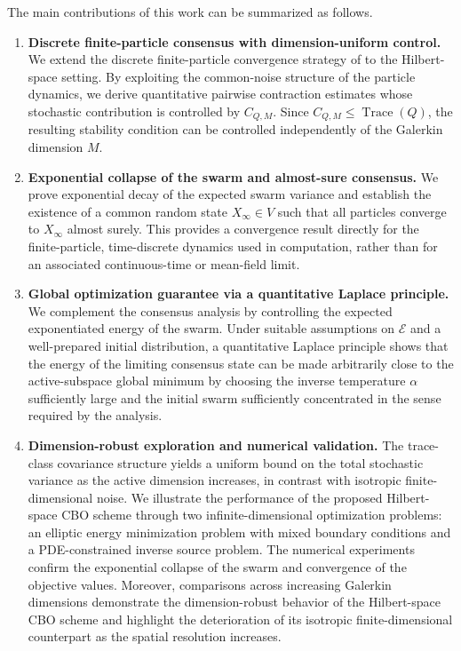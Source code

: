 \documentclass[12pt]{amsart}
\numberwithin{equation}{section}
\begin{document}
The main contributions of this work can be summarized as follows.
\begin{enumerate}
    \item \textbf{Discrete finite-particle consensus with dimension-uniform control.} We extend the discrete finite-particle convergence strategy of \cite{ha2020convergence,ha2021convergence} to the Hilbert-space setting. By exploiting the common-noise structure of the particle dynamics, we derive quantitative pairwise contraction estimates whose stochastic contribution is controlled by $C_{Q,M}$. Since $C_{Q,M}\leq\operatorname{Trace}(Q)$, the resulting stability condition can be controlled independently of the Galerkin dimension $M$.

    \item \textbf{Exponential collapse of the swarm and almost-sure consensus.} We prove exponential decay of the expected swarm variance and establish the existence of a common random state $X_\infty\in V$ such that all particles converge to $X_\infty$ almost surely. This provides a convergence result directly for the finite-particle, time-discrete dynamics used in computation, rather than for an associated continuous-time or mean-field limit.

    \item \textbf{Global optimization guarantee via a quantitative Laplace principle.} We complement the consensus analysis by controlling the expected exponentiated energy of the swarm. Under suitable assumptions on $\mathscr{E}$ and a well-prepared initial distribution, a quantitative Laplace principle shows that the energy of the limiting consensus state can be made arbitrarily close to the active-subspace global minimum by choosing the inverse temperature $\alpha$ sufficiently large and the initial swarm sufficiently concentrated in the sense required by the analysis.

    \item \textbf{Dimension-robust exploration and numerical validation.} The trace-class covariance structure yields a uniform bound on the total stochastic variance as the active dimension increases, in contrast with isotropic finite-dimensional noise. We illustrate the performance of the proposed Hilbert-space CBO scheme through two infinite-dimensional optimization problems: an elliptic energy minimization problem with mixed boundary conditions and a PDE-constrained inverse source problem. The numerical experiments confirm the exponential collapse of the swarm and convergence of the objective values. Moreover, comparisons across increasing Galerkin dimensions demonstrate the dimension-robust behavior of the Hilbert-space CBO scheme and highlight the deterioration of its isotropic finite-dimensional counterpart as the spatial resolution increases.
\end{enumerate}
\end{document}
